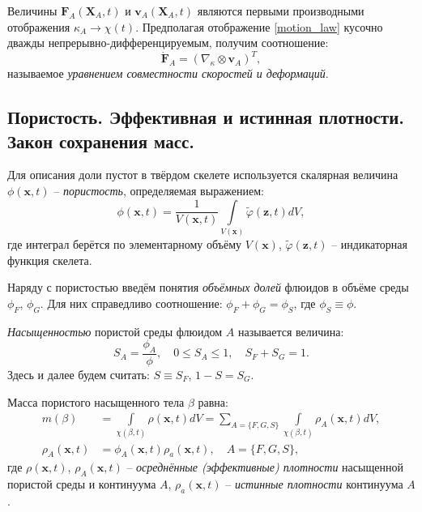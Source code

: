 	Величины $\boldsymbol{F}_A(\boldsymbol{X}_A, t)$ и $\boldsymbol{v}_A(\boldsymbol{X}_A, t)$ являются первыми производными отображения $\kappa_A \to \chi(t)$. Предполагая отображение \eqref{motion_law} кусочно дважды непрерывно-дифференцируемым, получим соотношение:
\begin{equation}
	\label{velocities_strains}
	\dot{\boldsymbol{F}}_A = \left(\nabla_{\kappa} \otimes \boldsymbol{v}_A \right)^T,
\end{equation}
	называемое \textit{уравнением совместности скоростей и деформаций}.

\subsection{Пористость. Эффективная и истинная плотности. Закон сохранения масс.}

	Для описания доли пустот в твёрдом скелете используется скалярная величина $\phi(\boldsymbol{x}, t)$ -- \textit{пористость}, определяемая выражением:
\begin{equation}
	\label{porosity}
	\phi(\boldsymbol{x}, t) = \frac{1}{V(\boldsymbol{x}, t)}\int\limits_{V(\boldsymbol{x})}\tilde{\varphi}(\boldsymbol{z}, t) dV,
\end{equation}
	где интеграл берётся по элементарному объёму $V(\boldsymbol{x})$, $\tilde{\varphi}(\boldsymbol{z}, t)$ -- индикаторная функция скелета.

	Наряду с пористостью введём понятия \textit{объёмных долей} флюидов в объёме среды $\phi_F$, $\phi_G$. Для них справедливо соотношение: $\phi_F + \phi_G = \phi_S$, где $\phi_S \equiv \phi$.
	
	\textit{Насыщенностью} пористой среды флюидом $A$ называется величина:
\begin{equation}
	\label{satur}
	S_A = \frac{\phi_A}{\phi}, \quad 0 \leq S_A \leq 1, \quad S_F + S_G = 1.
\end{equation}
	Здесь и далее будем считать: $S \equiv S_F$, $1-S = S_G$.

	Масса пористого насыщенного тела $\beta$ равна:
\begin{align}
	\label{mass}
	m(\beta) &= \int\limits_{\chi(\beta, t)} \rho(\boldsymbol{x}, t) dV = 
	\sum\limits_{A=\{F, G, S\}}\int\limits_{\chi(\beta, t)} \rho_A(\boldsymbol{x}, t) dV,\\
	\rho_A(\boldsymbol{x}, t) &= \phi_A(\boldsymbol{x}, t) \rho_a(\boldsymbol{x}, t), \quad A = \{F, G, S\},
\end{align}
	где $\rho(\boldsymbol{x}, t)$, $\rho_A(\boldsymbol{x}, t)$ -- \textit{осреднённые (эффективные) плотности} насыщенной пористой среды и континуума $A$,
	$\rho_a(\boldsymbol{x}, t)$ -- \textit{истинные плотности} континуума $A$.

